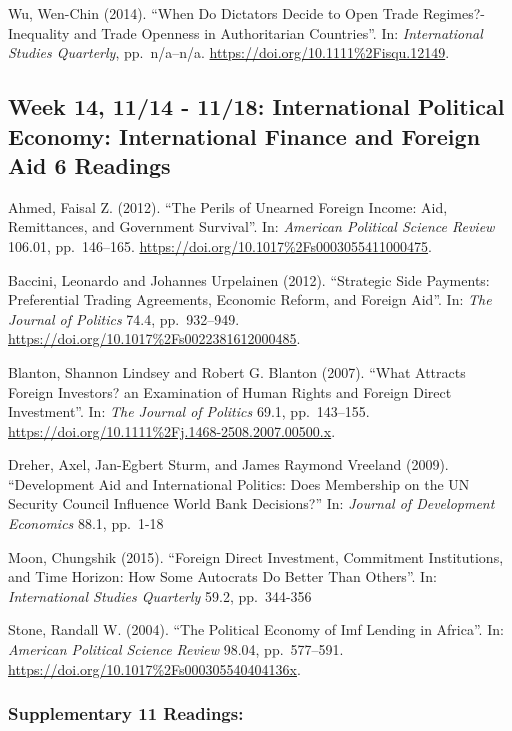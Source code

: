 \documentclass[10pt,]{article}
\begin{document}
Wu, Wen-Chin (2014). ``When Do Dictators Decide to Open Trade
Regimes?-Inequality and Trade Openness in Authoritarian Countries''. In:
\emph{International Studies Quarterly}, pp.~n/a--n/a.
\url{https://doi.org/10.1111\%2Fisqu.12149}.

\subsection{Week 14, 11/14 - 11/18: International Political Economy:
International Finance and Foreign Aid \textbar{} 6
Readings}\label{week-14-1114---1118-international-political-economy-international-finance-and-foreign-aid-6-readings}

Ahmed, Faisal Z. (2012). ``The Perils of Unearned Foreign Income: Aid,
Remittances, and Government Survival''. In:
\emph{American Political Science Review} 106.01, pp.~146--165.
\url{https://doi.org/10.1017\%2Fs0003055411000475}.

Baccini, Leonardo and Johannes Urpelainen (2012). ``Strategic Side
Payments: Preferential Trading Agreements, Economic Reform, and Foreign
Aid''. In: \emph{The Journal of Politics} 74.4, pp.~932--949.
\url{https://doi.org/10.1017\%2Fs0022381612000485}.

Blanton, Shannon Lindsey and Robert G. Blanton (2007). ``What Attracts
Foreign Investors? an Examination of Human Rights and Foreign Direct
Investment''. In: \emph{The Journal of Politics} 69.1, pp.~143--155.
\url{https://doi.org/10.1111\%2Fj.1468-2508.2007.00500.x}.

Dreher, Axel, Jan-Egbert Sturm, and James Raymond Vreeland (2009).
``Development Aid and International Politics: Does Membership on the UN
Security Council Influence World Bank Decisions?'' In:
\emph{Journal of Development Economics} 88.1, pp.~1-18

Moon, Chungshik (2015). ``Foreign Direct Investment, Commitment
Institutions, and Time Horizon: How Some Autocrats Do Better Than
Others''. In: \emph{International Studies Quarterly} 59.2, pp.~344-356

Stone, Randall W. (2004). ``The Political Economy of Imf Lending in
Africa''. In: \emph{American Political Science Review} 98.04,
pp.~577--591. \url{https://doi.org/10.1017\%2Fs000305540404136x}.

\subsubsection{Supplementary \textbar{} 11
Readings:}\label{supplementary-11-readings}
\end{document}
